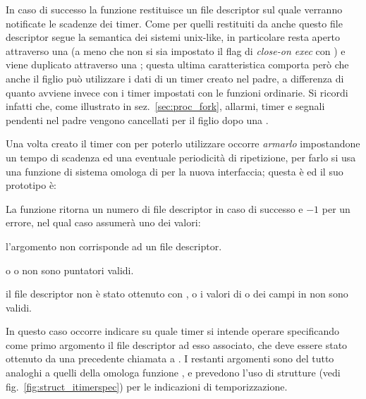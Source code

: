 In caso di successo la funzione restituisce un file descriptor sul quale
verranno notificate le scadenze dei timer. Come per quelli restituiti da
 anche questo file descriptor segue la semantica dei sistemi
unix-like, in particolare resta aperto attraverso una  (a meno che
non si sia impostato il flag di \textit{close-on exec} con
) e viene duplicato attraverso una ; questa
ultima caratteristica comporta però che anche il figlio può utilizzare i dati
di un timer creato nel padre, a differenza di quanto avviene invece con i
timer impostati con le funzioni ordinarie. Si ricordi infatti che, come
illustrato in sez.~\ref{sec:proc_fork}, allarmi, timer e segnali pendenti nel
padre vengono cancellati per il figlio dopo una .

Una volta creato il timer con  per poterlo utilizzare
occorre \textsl{armarlo} impostandone un tempo di scadenza ed una eventuale
periodicità di ripetizione, per farlo si usa una funzione di sistema omologa
di  per la nuova interfaccia; questa è
 ed il suo prototipo è:

\begin{funcproto}{

}

{La funzione ritorna un numero di file descriptor in caso di successo e $-1$
  per un errore, nel qual caso  assumerà uno dei valori:
  \begin{errlist}
  \item[\errcode{EBADF}] l'argomento  non corrisponde ad un file
    descriptor. 
  \item[\errcode{EFAULT}] o  o  non sono
    puntatori validi.
  \item[\errcode{EINVAL}] il file descriptor  non è stato ottenuto
    con , o i valori di  o dei campi
     in  non sono validi.
  \end{errlist}
}  
\end{funcproto}

In questo caso occorre indicare su quale timer si intende operare specificando
come primo argomento il file descriptor ad esso associato, che deve essere
stato ottenuto da una precedente chiamata a . I restanti
argomenti sono del tutto analoghi a quelli della omologa funzione
, e prevedono l'uso di strutture 
(vedi fig.~\ref{fig:struct_itimerspec}) per le indicazioni di temporizzazione.

